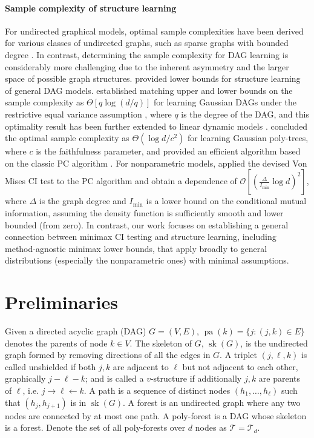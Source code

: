 \documentclass{article}
\theoremstyle{definition}
\theoremstyle{definition}
\theoremstyle{definition}
\theoremstyle{definition}
\theoremstyle{definition}
\theoremstyle{definition}
\theoremstyle{remark}
\theoremstyle{remark}
\DeclareMathOperator{\pa}{pa}
\DeclareMathOperator{\sk}{sk}
\newcommand{\pltr}{\mathcal{T}}
\newcommand{\dd}{d}
\begin{document}
\paragraph{Sample complexity of structure learning}
For undirected graphical models, optimal sample complexities have been derived for various classes of undirected graphs, such as sparse graphs with bounded degree \cite{wang2010information,santhanam2012information,bresler2015efficiently,vuffray2016interaction,abbe2018community,misra2020information}. 
In contrast, determining the sample complexity for DAG learning is considerably more challenging due to the inherent asymmetry and the larger space of possible graph structures.
\citet{ghoshal2017information} provided lower bounds for structure learning of general DAG models.
\citet{gao2022optimal} established matching upper and lower bounds on the sample complexity as $\Theta[ q\log (\dd /q) ]$ for learning Gaussian DAGs under the restrictive equal variance assumption \citep{peters2014identifiability,loh2014high,chen2019causal}, where $q$ is the degree of the DAG, and this optimality result has been further extended to linear dynamic models \citep{veedu2024information}.
\citet{wang2024optimal} concluded the optimal sample complexity as $\Theta(\log\dd / c^2)$ for learning Gaussian poly-trees, where $c$ is the faithfulness parameter, and provided an efficient algorithm based on the classic PC algorithm \citep{spirtes2000causation}.
For nonparametric models, \citet{jamshidi2024on} applied the devised Von Mises CI test to the PC algorithm and obtain a dependence of $\mathcal{O}[(\frac{\Delta}{I_{\min}}\log \dd)^2]$, where $\Delta$ is the graph degree and $I_{\min}$ is a lower bound on the conditional mutual information, assuming the density function is sufficiently smooth and lower bounded (from zero).
In contrast, our work focuses on establishing a general connection between minimax CI testing and structure learning, including method-agnostic minimax lower bounds, that apply broadly to general distributions (especially the nonparametric ones) with minimal assumptions.











\section{Preliminaries}\label{sec:prelim}
Given a directed acyclic graph (DAG) $G=(V,E)$, $\pa(k) = \{j:(j,k)\in E\}$ denotes the parents of node $k\in V$.
The skeleton of $G$, $\sk(G)$, is the undirected graph formed by removing directions of all the edges in $G$.
A triplet $(j,\ell,k)$ is called unshielded if both $j,k$ are adjacent to $\ell$ but not adjacent to each other, graphically $j-\ell-k$; and is called a $v$-structure if additionally $j,k$ are parents of $\ell$, i.e. $j\rightarrow \ell \leftarrow k$.
A path is a sequence of distinct nodes $(h_1,\ldots, h_\ell)$ such that $(h_j, h_{j+1})$ is in $\sk(G)$.
A forest is an undirected graph where any two nodes are connected by at most one path. A poly-forest is a DAG whose skeleton is a forest.
Denote the set of all poly-forests over $d$ nodes as $\pltr=\pltr_d$.
\end{document}
